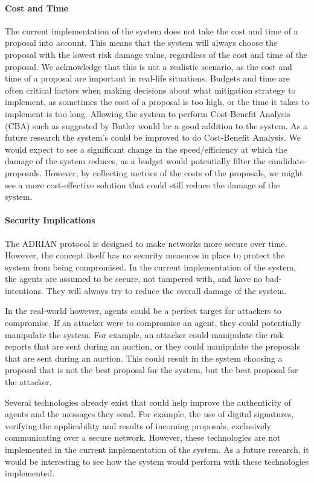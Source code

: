 \paragraph{Cost and Time}
The current implementation of the system does not take the cost and time of a proposal into account. This means that the system will always choose the proposal with the lowest risk damage value, regardless of the cost and time of the proposal. We acknowledge that this is not a realistic scenario, as the cost and time of a proposal are important in real-life situations. Budgets and time are often critical factors when making decisions about what mitigation strategy to implement, as sometimes the cost of a proposal is too high, or the time it takes to implement is too long. Allowing the system to perform Cost-Benefit Analysis (CBA) such as suggested by Butler \cite{butler2002security} would be a good addition to the system. As a future research the system's  could be improved to do Cost-Benefit Analysis. We would expect to see a significant change in the speed/efficiency at which the damage of the system reduces, as a budget would potentially filter the candidate-proposals. However, by collecting metrics of the costs of the proposals, we might see a more cost-effective solution that could still reduce the damage of the system.

\paragraph{Security Implications}
The ADRIAN protocol is designed to make networks more secure over time. However, the concept itself has no security measures in place to protect the system from being compromised. In the current implementation of the system, the agents are assumed to be secure, not tampered with, and have no bad-intentions. They will always try to reduce the overall damage of the system.

In the real-world however, agents could be a perfect target for attackers to compromise. If an attacker were to compromise an agent, they could potentially manipulate the system. For example, an attacker could manipulate the risk reports that are sent during an auction, or they could manipulate the proposals that are sent during an auction. This could result in the system choosing a proposal that is not the best proposal for the system, but the best proposal for the attacker.

Several technologies already exist that could help improve the authenticity of agents and the messages they send. For example, the use of digital signatures, verifying the applicability and results of incoming proposals, exclusively communicating over a secure network. However, these technologies are not implemented in the current implementation of the system. As a future research, it would be interesting to see how the system would perform with these technologies implemented. 
